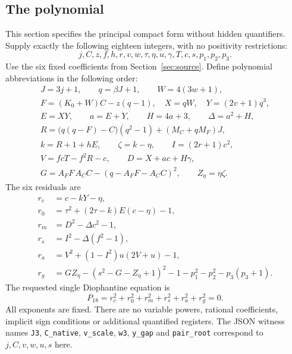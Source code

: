 \documentclass[11pt]{article}
\theoremstyle{remark}\newtheorem{remark}[theorem]{Remark}
\begin{document}
\subsection{The polynomial}
This section specifies the principal compact form without hidden
quantifiers. Supply exactly the following eighteen integers, with no
positivity restrictions:
\begin{equation}
 j,C,z,f,h,r,v,w,\tau,\eta,u,\gamma,T,c,s,p_1,p_2,p_3.
 \label{eq:variables19}
\end{equation}
Use the six fixed coefficients from Section~\ref{sec:source}. Define
polynomial abbreviations in the following order:
\begin{gather}
 J=3j+1,\qquad q=\beta J+1,\qquad W=4(3w+1),\nonumber\\
 F=(K_0+W)C-z(q-1),\quad X=qW,\quad Y=(2v+1)q^3,\nonumber\\
 E=XY,\qquad a=E+Y,\qquad H=4a+3,\qquad\Delta=a^2+H,\nonumber\\
 R=\bigl(q(q-F)-C\bigr)(q^2-1)+(M_C+qM_F)J,\nonumber\\
 k=R+1+hE,\qquad\zeta=k-\eta,\qquad I=(2r+1)c^2,\nonumber\\
 V=fcT-f^2R-c,\qquad D=X+ac+H\gamma,\nonumber\\
 G=A_FF\,A_CC-(q-A_FF-A_CC)^2,\qquad Z_\eta=\eta\zeta.
                                                        \label{eq:regs19}
\end{gather}
The six residuals are
\begin{align}
 r_c&=c-kY-\eta,\nonumber\\
 r_0&=\tau^2+(2\tau-k)E(c-\eta)-1,\nonumber\\
 r_m&=D^2-\Delta c^2-1,\nonumber\\
 r_s&=I^2-\Delta(f^2-1),\nonumber\\
 r_a&=V^2+(1-I^2)u(2V+u)-1,\nonumber\\
 r_g&=GZ_\eta-(s^2-G-Z_\eta+1)^2
                 -1-p_1^2-p_2^2-p_3(p_3+1).             \label{eq:rows19}
\end{align}
The requested single Diophantine equation is
\begin{equation}
 \boxed{P_{18}=r_c^2+r_0^2+r_m^2+r_s^2+r_a^2+r_g^2=0.}
                                                        \label{eq:p19}
\end{equation}
All exponents are fixed. There are no variable powers, rational
coefficients, implicit sign conditions or additional quantified registers.
The JSON witness names \texttt{J3}, \texttt{C\_native},
\texttt{v\_scale}, \texttt{w3}, \texttt{y\_gap} and
\texttt{pair\_root} correspond to $j,C,v,w,u,s$ here.
\end{document}
